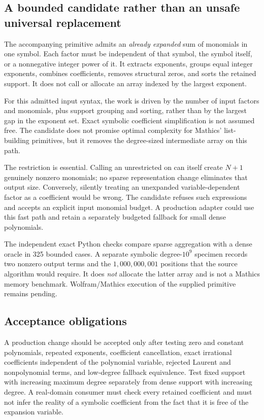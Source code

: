 \documentclass[11pt,a4paper]{article}
\newcommand{\code}[1]{\texttt{\detokenize{#1}}}
\begin{document}
\subsection{A bounded candidate rather than an unsafe universal replacement}

The accompanying \code{SparseMonomialRules} primitive admits an
\emph{already expanded} sum of monomials in one symbol. Each factor must be
independent of that symbol, the symbol itself, or a nonnegative integer power of
it. It extracts exponents, groups equal integer exponents, combines
coefficients, removes structural zeros, and sorts the retained support. It does
not call \code{Expand} or allocate an array indexed by the largest exponent.

For this admitted input syntax, the work is driven by the number of input
factors and monomials, plus support grouping and sorting, rather than by the
largest gap in the exponent set. Exact symbolic coefficient simplification is
not assumed free. The candidate does not promise optimal complexity for
Mathics' list-building primitives, but it removes the degree-sized intermediate
array on this path.

The restriction is essential. Calling an unrestricted \code{Expand} on
\code{(1+L)^N} can itself create $N+1$ genuinely nonzero monomials; no sparse
representation change eliminates that output size. Conversely, silently
treating an unexpanded variable-dependent factor as a coefficient would be
wrong. The candidate refuses such expressions and accepts an explicit input
monomial budget. A production adapter could use this fast path and retain a
separately budgeted fallback for small dense polynomials.

The independent exact Python checks compare sparse aggregation with a dense
oracle in 325 bounded cases. A separate symbolic degree-$10^9$ specimen records
two nonzero output terms and the $1{,}000{,}000{,}001$ positions that the source
algorithm would require. It does \emph{not} allocate the latter array and is not
a Mathics memory benchmark. Wolfram/Mathics execution of the supplied primitive
remains pending.

\subsection{Acceptance obligations}

A production change should be accepted only after testing zero and constant
polynomials, repeated exponents, coefficient cancellation, exact irrational
coefficients independent of the polynomial variable, rejected Laurent and
nonpolynomial terms, and low-degree fallback equivalence. Test fixed support
with increasing maximum degree separately from dense support with increasing
degree. A real-domain consumer must check every retained coefficient and must
not infer the reality of a symbolic coefficient from the fact that it is free
of the expansion variable.
\end{document}
